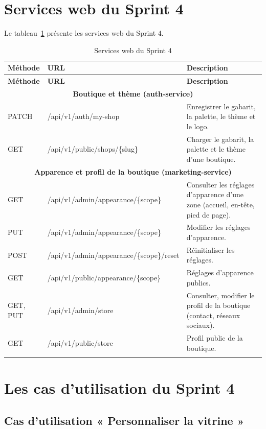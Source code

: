 \section{Services web du Sprint 4}
Le tableau~\ref{tab:ws-sprint4} présente les services web du Sprint 4.
\renewcommand{\arraystretch}{1.15}
\setlength{\tabcolsep}{4pt}
\begin{longtable}{|p{1.5cm}|p{6.8cm}|p{6.2cm}|}
\hline
\textbf{Méthode} & \textbf{URL} & \textbf{Description} \\
\hline
\endfirsthead
\hline
\textbf{Méthode} & \textbf{URL} & \textbf{Description} \\
\hline
\endhead
\multicolumn{3}{|c|}{\textbf{Boutique et thème (auth-service)}} \\
\hline
PATCH & /api/v1/auth/my-shop & Enregistrer le gabarit, la palette, le thème et le logo. \\
\hline
GET & /api/v1/public/shops/\{slug\} & Charger le gabarit, la palette et le thème d'une boutique. \\
\hline
\multicolumn{3}{|c|}{\textbf{Apparence et profil de la boutique (marketing-service)}} \\
\hline
GET & /api/v1/admin/appearance/\{scope\} & Consulter les réglages d'apparence d'une zone (accueil, en-tête, pied de page). \\
\hline
PUT & /api/v1/admin/appearance/\{scope\} & Modifier les réglages d'apparence. \\
\hline
POST & /api/v1/admin/appearance/\{scope\}/reset & Réinitialiser les réglages. \\
\hline
GET & /api/v1/public/appearance/\{scope\} & Réglages d'apparence publics. \\
\hline
GET, PUT & /api/v1/admin/store & Consulter, modifier le profil de la boutique (contact, réseaux sociaux). \\
\hline
GET & /api/v1/public/store & Profil public de la boutique. \\
\hline
\caption{Services web du Sprint 4}
\label{tab:ws-sprint4}
\end{longtable}

\section{Les cas d'utilisation du Sprint 4}
\subsection{Cas d'utilisation « Personnaliser la vitrine »}
